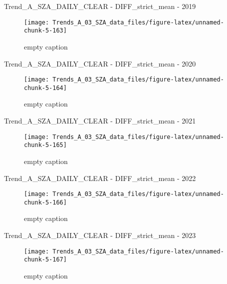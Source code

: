 \documentclass[
  10pt,
  a4paper,oneside]{article}
\begin{document}
Trend\_A\_SZA\_DAILY\_CLEAR - DIFF\_strict\_mean - 2019

\begin{figure}[!ht]

{\centering \texttt{[image: Trends\_A\_03\_SZA\_data\_files/figure-latex/unnamed-chunk-5-163]} 

}

\caption{ empty caption }\label{fig:unnamed-chunk-5-163}
\end{figure}

Trend\_A\_SZA\_DAILY\_CLEAR - DIFF\_strict\_mean - 2020

\begin{figure}[!ht]

{\centering \texttt{[image: Trends\_A\_03\_SZA\_data\_files/figure-latex/unnamed-chunk-5-164]} 

}

\caption{ empty caption }\label{fig:unnamed-chunk-5-164}
\end{figure}

Trend\_A\_SZA\_DAILY\_CLEAR - DIFF\_strict\_mean - 2021

\begin{figure}[!ht]

{\centering \texttt{[image: Trends\_A\_03\_SZA\_data\_files/figure-latex/unnamed-chunk-5-165]} 

}

\caption{ empty caption }\label{fig:unnamed-chunk-5-165}
\end{figure}

Trend\_A\_SZA\_DAILY\_CLEAR - DIFF\_strict\_mean - 2022

\begin{figure}[!ht]

{\centering \texttt{[image: Trends\_A\_03\_SZA\_data\_files/figure-latex/unnamed-chunk-5-166]} 

}

\caption{ empty caption }\label{fig:unnamed-chunk-5-166}
\end{figure}

Trend\_A\_SZA\_DAILY\_CLEAR - DIFF\_strict\_mean - 2023

\begin{figure}[!ht]

{\centering \texttt{[image: Trends\_A\_03\_SZA\_data\_files/figure-latex/unnamed-chunk-5-167]} 

}

\caption{ empty caption }\label{fig:unnamed-chunk-5-167}
\end{figure}
\end{document}
